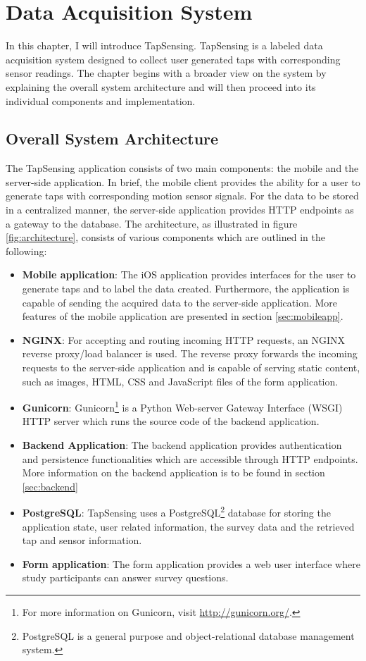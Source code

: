\chapter{Data Acquisition System\label{cha:chapter3}}
In this chapter, I will introduce TapSensing. TapSensing is a labeled data acquisition system designed to collect user generated taps with corresponding sensor readings. The chapter begins with a broader view on the system by explaining the overall system architecture and will then proceed into its individual components and implementation.

\section{Overall System Architecture}

The TapSensing application consists of two main components: the mobile and the server-side application. In brief, the mobile client provides the ability for a user to generate taps with corresponding motion sensor signals. For the data to be stored in a centralized manner, the server-side application provides HTTP endpoints as a gateway to the database. The architecture, as illustrated in figure \ref{fig:architecture}, consists of various components which are outlined in the following:

\begin{itemize}
  \item \textbf{Mobile application}: The iOS application provides interfaces for the user to generate taps and to label the data created. Furthermore, the application is capable of sending the acquired data to the server-side application. More features of the mobile application are presented in section \ref{sec:mobileapp}. %
  \item \textbf{NGINX}: For accepting and routing incoming HTTP requests, an NGINX reverse proxy/load balancer is used. The reverse proxy forwards the incoming requests to the server-side application and is capable of serving static content, such as images, HTML, CSS and JavaScript files of the form application.
  \item \textbf{Gunicorn}: Gunicorn\footnote{For more information on Gunicorn, visit \url{http://gunicorn.org/}.} is a Python Web-server Gateway Interface (WSGI) HTTP server which runs the source code of the backend application.
  \item \textbf{Backend Application}: The backend application provides authentication and persistence functionalities which are accessible through HTTP endpoints. More information on the backend application is to be found in section \ref{sec:backend}
  \item \textbf{PostgreSQL}: TapSensing uses a PostgreSQL\footnote{PostgreSQL is a general purpose and object-relational database management system.} database for storing the application state, user related information, the survey data and the retrieved tap and sensor information.
  \item \textbf{Form application}: The form application provides a web user interface where study participants can answer survey questions.
\end{itemize}

